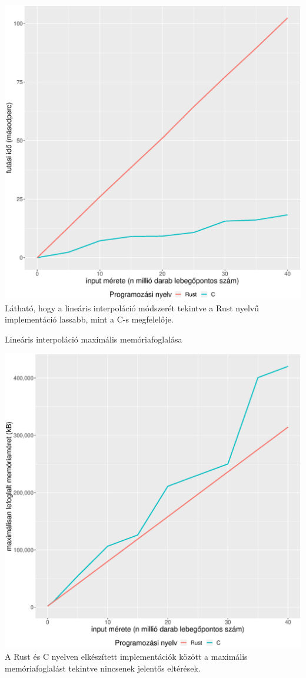 \includegraphics[width=15.5cm]{kepek/linear_interpolation_run.eps}
Látható, hogy a lineáris interpoláció módszerét tekintve a Rust nyelvű implementáció lassabb, mint a C-s megfelelője.


\noindent Lineáris interpoláció maximális memóriafoglalása

\includegraphics[width=15.5cm]{kepek/linear_interpolation_memory.eps}
A Rust és C nyelven elkészített implementációk között a maximális memóriafoglalást tekintve nincsenek jelentős eltérések.
